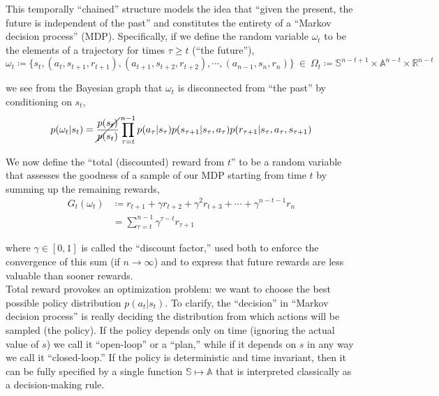 This temporally ``chained'' structure models the idea that ``given the present, the future is independent of the past'' and constitutes the entirety of a ``Markov decision process'' (MDP). Specifically, if we define the random variable $\omega_t$ to be the elements of a trajectory for times $\tau \geq t$ (``the future''),
\begin{equation*}
\omega_t \coloneqq \{s_t, (a_t, s_{t+1}, r_{t+1}), (a_{t+1}, s_{t+2}, r_{t+2}), \cdots, (a_{n-1}, s_{n}, r_n)\} \ \in \ \Omega_t \coloneqq \mathbb{S}^{n-t+1} \times \mathbb{A}^{n-t} \times \mathbb{R}^{n-t}
\end{equation*}

we see from the Bayesian graph that $\omega_t$ is disconnected from ``the past'' by conditioning on $s_t$,
\begin{equation*}
p(\omega_t|s_t) = \cancel{\frac{p(s_t)}{p(s_t)}}\prod_{\tau=t}^{n-1} p(a_\tau|s_\tau)p(s_{\tau+1}|s_\tau,a_\tau)p(r_{\tau+1}|s_\tau,a_\tau,s_{\tau+1})
\end{equation*}

We now define the ``total (discounted) reward from $t$'' to be a random variable that assesses the goodness of a sample of our MDP starting from time $t$ by summing up the remaining rewards,
\begin{align*}
G_t(\omega_t) &\coloneqq r_{t+1} + \gamma r_{t+2} + \gamma^2 r_{t+3} + \cdots + \gamma^{n-t-1} r_n\\
&= \sum_{\tau=t}^{n-1} \gamma^{\tau-t} r_{\tau+1}
\end{align*}

where $\gamma \in [0,1]$ is called the ``discount factor,'' used both to enforce the convergence of this sum (if $n \to \infty$) and to express that future rewards are less valuable than sooner rewards.\\

Total reward provokes an optimization problem: we want to choose the best possible policy distribution $p(a_t|s_t)$. To clarify, the ``decision'' in ``Markov decision process'' is really deciding the distribution from which actions will be sampled (the policy). If the policy depends only on time (ignoring the actual value of $s$) we call it ``open-loop'' or a ``plan,'' while if it depends on $s$ in any way we call it ``closed-loop.'' If the policy is deterministic and time invariant, then it can be fully specified by a single function $\mathbb{S} \mapsto \mathbb{A}$ that is interpreted classically as a decision-making rule.\\

